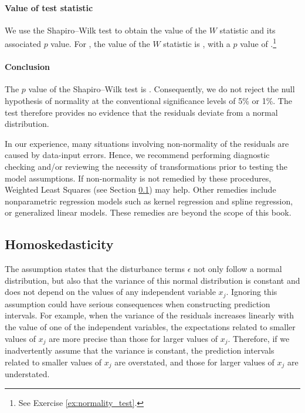

\paragraph{Value of test statistic} We use the Shapiro--Wilk test to obtain the value of the $W$ statistic and its associated $p$ value. For , the value of the $W$ statistic is \RegModThreeW, with a $p$ value of \RegModThreeShapiroP.\footnote{See Exercise \ref{ex:normality_test}.}

\paragraph{Conclusion}

The $p$ value of the Shapiro--Wilk test is \RegModThreeShapiroP. Con\-se\-quently, we do not reject the null hypothesis of normality at the conventional significance levels of 5\% or 1\%. The test therefore provides no evidence that the residuals deviate from a normal distribution.

\bigskip
In our experience, many situations involving non-normality of the residuals are caused by data-input errors. Hence, we recommend performing diagnostic checking and/or reviewing the necessity of transformations prior to testing the model assumptions. If non-normality is not remedied by these procedures, Weighted Least Squares (see Section \ref{sub:homoskedasticity}) may help. Other remedies include nonparametric regression models such as kernel regression and spline regression, or generalized linear models. These remedies are beyond the scope of this book.


\subsection{Homoskedasticity} %
\label{sub:homoskedasticity}

The  assumption states that the disturbance terms $\epsilon$ not only follow a normal distribution, but also that the variance of this normal distribution is constant and does not depend on the values of any independent variable $x_j$. Ignoring this assumption could have serious consequences when constructing prediction intervals. For example, when the variance of the residuals increases linearly with the value of one of the independent variables, the expectations related to smaller values of $x_j$ are more precise than those for larger values of $x_j$. Therefore, if we inadvertently assume that the variance is constant, the prediction intervals related to smaller values of $x_j$ are overstated, and those for larger values of $x_j$ are understated. 

